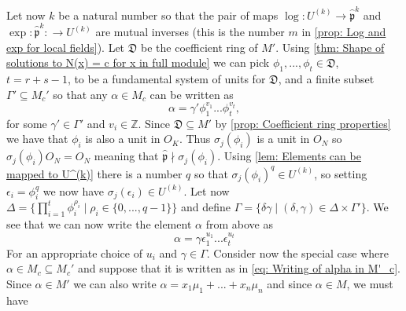 \documentclass{article}
\newcommand{\mfrak}[1]{\mathfrak{#1}}
\newcommand{\mbb}[1]{\mathbb{#1}}
\numberwithin{equation}{section}
\begin{document}
Let now $k$ be a natural number so that the pair of maps $\log : U^{(k)} \to \hat {\mfrak p}^k$
and $\exp : \hat {\mfrak p}^k : \to U^{(k)}$ are mutual inverses (this is the number $m$ in \cref{prop: Log and exp for local fields}). Let $\mfrak D$ be the coefficient ring of $M'$. Using \cref{thm: Shape of solutions to N(x) = c for x in full module} we can pick $\phi_1, ..., \phi_t \in \mfrak D$, $t = r + s - 1$, to be a fundamental system of units for $\mfrak D$, and a finite subset $\Gamma' \subseteq M_c'$ so that any $\alpha \in M_c$ can be written as
$$\alpha = \gamma' \phi_1^{v_1} ... \phi_t^{v_t},$$
for some $\gamma' \in \Gamma'$ and $v_i \in \mbb Z$. Since $\mfrak D \subseteq M'$ by \cref{prop: Coefficient ring properties} we have that $\phi_i$ is also a unit in $O_K$. Thus $\sigma_j(\phi_i)$ is a unit in $O_N$ so $\sigma_j(\phi_i) O_N = O_N$ meaning that $\hat {\mfrak p} \nmid \sigma_j(\phi_i)$. Using \cref{lem: Elements can be mapped to U^(k)} there is a number $q$ so that $\sigma_j(\phi_i)^q \in U^{(k)}$, so setting $\epsilon_i = \phi_i^q$ we now have $\sigma_j(\epsilon_i) \in U^{(k)}$. Let now $\Delta = \{\prod_{i = 1}^t \phi_i^{\rho_i} \mid \rho_i \in \{0, ..., q-1 \} \}$ and define $\Gamma = \{\delta \gamma \mid (\delta, \gamma) \in \Delta \times \Gamma' \}$. We see that we can now write the element $\alpha$ from above as
\begin{equation}\label{eq: Writing of alpha in M'_c}
    \alpha = \gamma \epsilon_1^{u_1} ... \epsilon_t^{u_t}
\end{equation}
For an appropriate choice of $u_i$ and $\gamma \in \Gamma$. Consider now the special case where $\alpha \in M_c \subseteq M_c'$ and suppose that it is written as in \cref{eq: Writing of alpha in M'_c}. Since $\alpha \in M'$ we can also write
$\alpha = x_1 \mu_1 + ... + x_n \mu_n$ and since $\alpha \in M$, we must have
\end{document}
